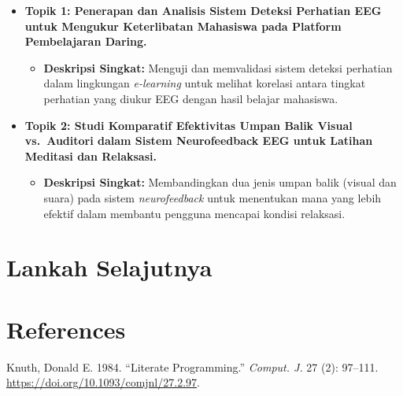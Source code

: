 \documentclass[
  letterpaper,
  DIV=11,
  numbers=noendperiod]{scrreprt}
\newlength{\cslhangindent}
\newenvironment{CSLReferences}[2] %
 {\begin{list}{}{%
  \setlength{\itemindent}{0pt}
  \setlength{\leftmargin}{0pt}
  \setlength{\parsep}{0pt}
  \ifodd #1
   \setlength{\leftmargin}{\cslhangindent}
   \setlength{\itemindent}{-1\cslhangindent}
  \fi
  \setlength{\itemsep}{#2\baselineskip}}}
 {\end{list}}
\providecommand{\tightlist}{%
  \setlength{\itemsep}{0pt}\setlength{\parskip}{0pt}}
\begin{document}
\begin{itemize}
\tightlist
\item
  \textbf{Topik 1: Penerapan dan Analisis Sistem Deteksi Perhatian EEG
  untuk Mengukur Keterlibatan Mahasiswa pada Platform Pembelajaran
  Daring.}

  \begin{itemize}
  \tightlist
  \item
    \textbf{Deskripsi Singkat:} Menguji dan memvalidasi sistem deteksi
    perhatian dalam lingkungan \emph{e-learning} untuk melihat korelasi
    antara tingkat perhatian yang diukur EEG dengan hasil belajar
    mahasiswa.
  \end{itemize}
\item
  \textbf{Topik 2: Studi Komparatif Efektivitas Umpan Balik Visual
  vs.~Auditori dalam Sistem Neurofeedback EEG untuk Latihan Meditasi dan
  Relaksasi.}

  \begin{itemize}
  \tightlist
  \item
    \textbf{Deskripsi Singkat:} Membandingkan dua jenis umpan balik
    (visual dan suara) pada sistem \emph{neurofeedback} untuk menentukan
    mana yang lebih efektif dalam membantu pengguna mencapai kondisi
    relaksasi.
  \end{itemize}
\end{itemize}


\chapter{Lankah Selajutnya}\label{lankah-selajutnya}


\chapter*{References}\label{references}


\label{refs}
\begin{CSLReferences}{1}{0}
Knuth, Donald E. 1984. {``Literate Programming.''} \emph{Comput. J.} 27
(2): 97--111. \url{https://doi.org/10.1093/comjnl/27.2.97}.

\end{CSLReferences}
\end{document}
